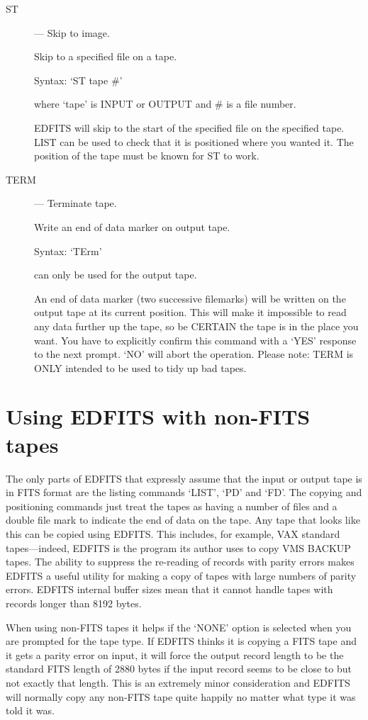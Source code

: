 \begin{description}
\item [ST] --- Skip to image.

Skip to a specified file on a tape.

Syntax:    `ST  tape  \#'

where `tape' is INPUT or OUTPUT and \# is a file number.

EDFITS will skip to the start of the specified file on the specified
tape.  LIST can be used to check that it is positioned where you wanted
it.  The position of the tape must be known for ST to work.

\item [TERM] --- Terminate tape.

Write an end of data marker on output tape.

Syntax:   `TErm'

can only be used for the output tape.

An end of data marker (two successive filemarks) will be written on the
output tape at its current position.  This will make it impossible to
read any data further up the tape, so be CERTAIN the tape is in the
place you want.    You have to explicitly confirm this command with a
`YES' response to the next prompt.  `NO' will abort the operation.
Please note: TERM is ONLY intended to be used to tidy up bad tapes.

\end{description}

\section{Using EDFITS with non-FITS tapes}

The only parts of EDFITS that expressly assume that the input or output
tape is in FITS format are the listing commands `LIST', `PD' and `FD'.
The copying and positioning commands just treat the tapes as having a
number of files and a double file mark to indicate the end of
data on the tape.  Any tape that looks like this can be copied using EDFITS.
This includes, for example, VAX standard tapes---indeed, EDFITS is the
program its author uses to copy VMS BACKUP tapes.  The ability to suppress
the re-reading of records with parity errors makes EDFITS a useful utility
for making a copy of tapes with large numbers of parity errors.  EDFITS
internal buffer sizes mean that it cannot handle tapes with records longer
than 8192 bytes.

When using non-FITS tapes it helps if the `NONE' option is selected when
you are prompted for the tape type.  If EDFITS thinks it is copying a FITS
tape and it gets a parity error on input, it will force the output record
length to be the standard FITS length of 2880 bytes if the input record
seems to be close to but not exactly that length.  This is an extremely
minor consideration and EDFITS will normally copy any non-FITS tape
quite happily no matter what type it was told it was.

